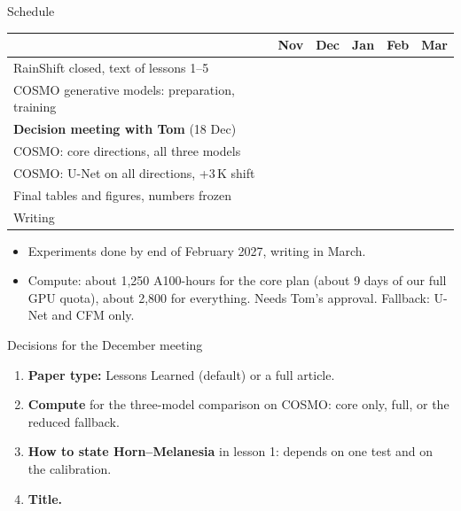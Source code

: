 \documentclass[11pt,aspectratio=169,xcolor=table]{beamer}
\newcommand{\cdone}{\cellcolor{done}}
\newcommand{\cplan}{\cellcolor{plan}}
\begin{document}
\begin{frame}{Schedule}
\small


\begin{tabular}{@{}l|c|c|c|c|c@{}}
 & Nov & Dec & Jan & Feb & Mar \\
\hline
RainShift closed, text of lessons 1--5      & \cdone & \cplan &    &    &    \\
COSMO generative models: preparation, training & & \cplan &    &    &    \\
\textbf{Decision meeting with Tom} (18 Dec) &    & \cplan &    &    &    \\
COSMO: core directions, all three models    &    &    & \cplan &    &    \\
COSMO: U-Net on all directions, +3\,K shift &    &    & \cplan & \cplan &    \\
Final tables and figures, numbers frozen    &    &    &    & \cplan &    \\
Writing                                     &    &    &    &    & \cplan \\
\end{tabular}

\medskip
\begin{itemize}
  \item Experiments done by end of February 2027, writing in March.
  \item Compute: about 1{,}250 A100-hours for the core plan (about 9 days
        of our full GPU quota), about 2{,}800 for everything. Needs Tom's
        approval. Fallback: U-Net and CFM only.
\end{itemize}
\end{frame}

\begin{frame}{Decisions for the December meeting}
\begin{enumerate}
  \item \textbf{Paper type:} Lessons Learned (default) or a full article.
  \item \textbf{Compute} for the three-model comparison on COSMO: core
        only, full, or the reduced fallback.
  \item \textbf{How to state Horn--Melanesia} in lesson 1: depends on one
        test and on the calibration.
  \item \textbf{Title.}
\end{enumerate}
\end{frame}
\end{document}
